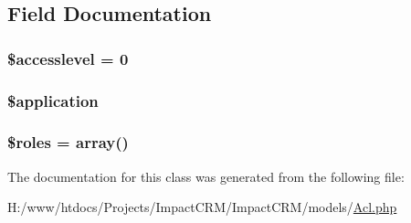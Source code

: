 \subsection{Field Documentation}
\hypertarget{classAcl_a0bf784879d9d0f847c5a766c72f4aa6d}{
\subsubsection[{\$accesslevel}]{\setlength{\rightskip}{0pt plus 5cm}\$accesslevel = 0}}
\label{classAcl_a0bf784879d9d0f847c5a766c72f4aa6d}
\hypertarget{classAcl_a537fa9b460dddc2a67074faab810398a}{
\subsubsection[{\$application}]{\setlength{\rightskip}{0pt plus 5cm}\$application}}
\label{classAcl_a537fa9b460dddc2a67074faab810398a}
\hypertarget{classAcl_a24a565772e407805783bcc46deeafeb3}{
\subsubsection[{\$roles}]{\setlength{\rightskip}{0pt plus 5cm}\$roles = array()}}
\label{classAcl_a24a565772e407805783bcc46deeafeb3}


The documentation for this class was generated from the following file:\begin{DoxyCompactItemize}
\item 
H:/www/htdocs/Projects/ImpactCRM/ImpactCRM/models/\hyperlink{Acl_8php}{Acl.php}\end{DoxyCompactItemize}
